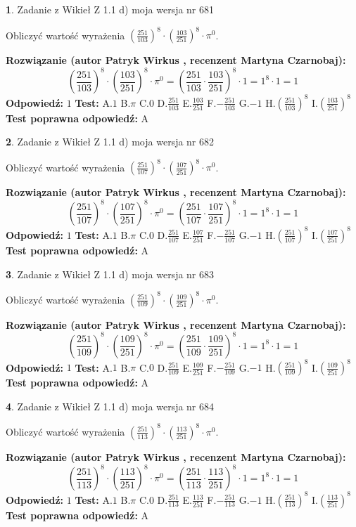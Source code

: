\documentclass[12pt, a4paper]{article}
\theoremstyle{definition} %
\newtheorem{zad}{}
\newcommand{\zadStart}[1]{\begin{zad}#1\newline}
\newcommand{\zadStop}{\end{zad}}
\newcommand{\rozwStart}[2]{\noindent \textbf{Rozwiązanie (autor #1 , recenzent #2): }\newline}
\newcommand{\rozwStop}{\newline}
\newcommand{\odpStart}{\noindent \textbf{Odpowiedź:}\newline}
\newcommand{\odpStop}{\newline}
\newcommand{\testStart}{\noindent \textbf{Test:}\newline}
\newcommand{\testStop}{\newline}
\newcommand{\kluczStart}{\noindent \textbf{Test poprawna odpowiedź:}\newline}
\newcommand{\kluczStop}{\newline}
\begin{document}
\zadStart{Zadanie z Wikieł Z 1.1 d) moja wersja nr 681}

Obliczyć wartość wyrażenia $(\frac{251}{103})^{8} \cdot (\frac{103}{251})^{8} \cdot \pi^{0}$.
\zadStop
\rozwStart{Patryk Wirkus}{Martyna Czarnobaj}
$$(\frac{251}{103})^{8} \cdot (\frac{103}{251})^{8} \cdot \pi^{0} = (\frac{251}{103} \cdot \frac{103}{251})^{8} \cdot 1 = 1^{8} \cdot 1 = 1$$
\rozwStop
\odpStart
$1$
\odpStop
\testStart
A.$1$ B.$\pi$ C.$0$ D.$\frac{251}{103}$ E.$\frac{103}{251}$
F.$-\frac{251}{103}$ G.$-1$
H.$(\frac{251}{103})^{8}$
I.$(\frac{103}{251})^{8}$
\testStop
\kluczStart
A
\kluczStop



\zadStart{Zadanie z Wikieł Z 1.1 d) moja wersja nr 682}

Obliczyć wartość wyrażenia $(\frac{251}{107})^{8} \cdot (\frac{107}{251})^{8} \cdot \pi^{0}$.
\zadStop
\rozwStart{Patryk Wirkus}{Martyna Czarnobaj}
$$(\frac{251}{107})^{8} \cdot (\frac{107}{251})^{8} \cdot \pi^{0} = (\frac{251}{107} \cdot \frac{107}{251})^{8} \cdot 1 = 1^{8} \cdot 1 = 1$$
\rozwStop
\odpStart
$1$
\odpStop
\testStart
A.$1$ B.$\pi$ C.$0$ D.$\frac{251}{107}$ E.$\frac{107}{251}$
F.$-\frac{251}{107}$ G.$-1$
H.$(\frac{251}{107})^{8}$
I.$(\frac{107}{251})^{8}$
\testStop
\kluczStart
A
\kluczStop



\zadStart{Zadanie z Wikieł Z 1.1 d) moja wersja nr 683}

Obliczyć wartość wyrażenia $(\frac{251}{109})^{8} \cdot (\frac{109}{251})^{8} \cdot \pi^{0}$.
\zadStop
\rozwStart{Patryk Wirkus}{Martyna Czarnobaj}
$$(\frac{251}{109})^{8} \cdot (\frac{109}{251})^{8} \cdot \pi^{0} = (\frac{251}{109} \cdot \frac{109}{251})^{8} \cdot 1 = 1^{8} \cdot 1 = 1$$
\rozwStop
\odpStart
$1$
\odpStop
\testStart
A.$1$ B.$\pi$ C.$0$ D.$\frac{251}{109}$ E.$\frac{109}{251}$
F.$-\frac{251}{109}$ G.$-1$
H.$(\frac{251}{109})^{8}$
I.$(\frac{109}{251})^{8}$
\testStop
\kluczStart
A
\kluczStop



\zadStart{Zadanie z Wikieł Z 1.1 d) moja wersja nr 684}

Obliczyć wartość wyrażenia $(\frac{251}{113})^{8} \cdot (\frac{113}{251})^{8} \cdot \pi^{0}$.
\zadStop
\rozwStart{Patryk Wirkus}{Martyna Czarnobaj}
$$(\frac{251}{113})^{8} \cdot (\frac{113}{251})^{8} \cdot \pi^{0} = (\frac{251}{113} \cdot \frac{113}{251})^{8} \cdot 1 = 1^{8} \cdot 1 = 1$$
\rozwStop
\odpStart
$1$
\odpStop
\testStart
A.$1$ B.$\pi$ C.$0$ D.$\frac{251}{113}$ E.$\frac{113}{251}$
F.$-\frac{251}{113}$ G.$-1$
H.$(\frac{251}{113})^{8}$
I.$(\frac{113}{251})^{8}$
\testStop
\kluczStart
A
\kluczStop
\end{document}
